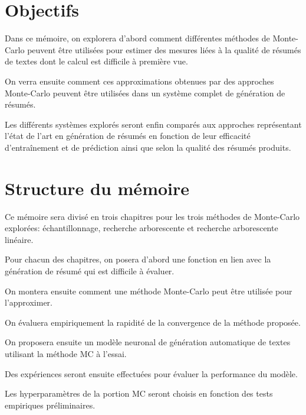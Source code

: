 \section*{Objectifs}

Dans ce mémoire, on explorera d'abord comment différentes méthodes de Monte-Carlo
peuvent être utilisées pour estimer des mesures liées à la qualité de résumés de textes
dont le calcul est difficile à première vue.

On verra ensuite comment ces approximations obtenues par des approches Monte-Carlo
peuvent être utilisées dans un système complet de génération de résumés.

Les différents systèmes explorés seront enfin comparés aux approches représentant
l'état de l'art en génération de résumés en fonction de leur efficacité d'entraînement
et de prédiction ainsi que selon la qualité des résumés produits.

\section*{Structure du mémoire}

Ce mémoire sera divisé en trois chapitres pour les trois méthodes de Monte-Carlo explorées:
échantillonnage, recherche arborescente et recherche arborescente linéaire.

Pour chacun des chapitres, on posera d'abord une fonction en lien avec la génération de résumé
qui est difficile à évaluer.

On montera ensuite comment une méthode Monte-Carlo
peut être utilisée pour l'approximer.

On évaluera empiriquement la rapidité
de la convergence de la méthode proposée.

On proposera ensuite un modèle neuronal
de génération automatique de textes utilisant la méthode MC à l'essai.

Des expériences seront ensuite effectuées pour évaluer la performance du modèle.

Les hyperparamètres de la portion MC seront choisis en fonction des tests
empiriques préliminaires.